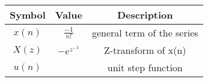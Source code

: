   \begin{tabular}{|c|c|c|}
    \hline
    	\textbf{Symbol} & \textbf{Value} & \textbf{Description} \\
    \hline
	  $x(n)$ & $\frac{-1}{n!}$ & general term of the series \\
    \hline
	  $X(z)$ & $- e^{z^{-1}}$ &Z-transform of x(n) \\
    \hline 
	  $u(n)$ & &unit step function \\
    \hline
  \end{tabular}
